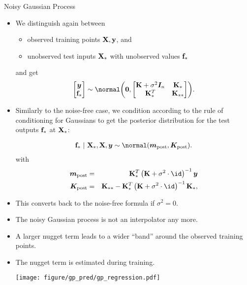 \documentclass[11pt,compress,t,notes=noshow, xcolor=table]{beamer}
\begin{document}
\begin{vbframe}{Noisy Gaussian Process}
\begin{itemize}
  \framebreak 
  
  \item We distinguish again between 
  \begin{itemize}
    \item observed training points $\mathbf{X}, \mathbf{y}$, and 
    \item unobserved test inputs $\mathbf{X}_*$ with unobserved values $\mathbf{f}_*$
  \end{itemize} 
  and get
  $$
  \begin{bmatrix}
  \bm{y} \\
  \fv_*
  \end{bmatrix} \sim  
    \normal\biggl(\bm{0}, \begin{bmatrix} \Kmat + \sigma^2 \bm{I}_n & \Kmat_* \\ \Kmat_*^T & \Kmat_{**} \end{bmatrix}\biggr).
  $$

\framebreak

  \item Similarly to the noise-free case, we condition according to the rule of conditioning for Gaussians to get the posterior distribution for the test outputs $\mathbf{f}_*$ at $\mathbf{X}_*$: 

  \begin{eqnarray*}
    \fv_* ~|~ \Xmat_*, \Xmat, \bm{y} \sim \normal(\bm{m}_{\text{post}}, \bm{K}_\text{post}).
\end{eqnarray*}
  with 
  \begin{eqnarray*}
    \bm{m}_{\text{post}} &=& \Kmat_{*}^{T} \left(\Kmat+ \sigma^2 \cdot \id\right)^{-1}\bm{y} \\
    \bm{K}_\text{post} &=& \Kmat_{**} - \Kmat_*^T \left(\Kmat  + \sigma^2 \cdot \id\right)^{-1}\Kmat_*,
  \end{eqnarray*}
\item This converts back to the noise-free formula if $\sigma^2 = 0$.

\framebreak 

\item The noisy Gaussian process is not an interpolator any more.
\item A larger nugget term leads to a wider ``band'' around the observed training points.
\item The nugget term is estimated during training.


\begin{center}
    \texttt{[image: figure/gp\_pred/gp\_regression.pdf]}
\end{center}
\end{itemize}

\end{vbframe}
\end{document}
